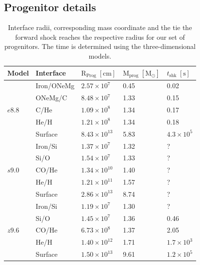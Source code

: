 \documentclass[fleqn,usenatbib]{mnras}
\begin{document}
\begin{appendices}
\section{Progenitor details}

\begin{table}
   \begin{tabular}{l l l l l} 
   \hline
     Model      &Interface & $\mathrm{R_{Prog}\;[cm]}$ & $\mathrm{M_{prog}\;[M_{\odot}]}$ & $t_{\mathrm{shk}}\;\mathrm{[s]}$\\ [0.5ex] 
   \hline
   \multirow{5}{*}{$e8.8$} & Iron/ONeMg & $2.57\times 10^{7}$  & 0.45 & 0.02 \\ 
                           & ONeMg/C    & $8.48\times 10^{7}$  & 1.33 & 0.15 \\
                           & C/He       & $1.09\times 10^{8}$  & 1.34 & 0.17 \\
                           & He/H       & $1.21\times 10^{8}$  & 1.34 & 0.18\\
                           & Surface    & $8.43\times 10^{13}$ & 5.83 & $4.3\times10^5$\\
   \hline
   \multirow{5}{*}{$s9.0$} & Iron/Si    & $1.37\times 10^{7}$   & 1.32 & ? \\ 
                           & Si/O       & $1.54\times 10^{7}$   & 1.33 & ? \\ 
                           & CO/He      & $1.34\times 10^{10}$  & 1.40 & ? \\
                           & He/H       & $1.21\times 10^{11}$  & 1.57 & ? \\
                           & Surface    & $2.86\times 10^{13}$  & 8.74 & ? \\
   \hline
   \multirow{5}{*}{$z9.6$} & Iron/Si    & $1.19\times 10^{7}$  & 1.30 & ?\\ 
                           & Si/O       & $1.45\times 10^{7}$  & 1.36 & 0.46\\ 
                           & CO/He      & $6.73\times 10^{8}$  & 1.37 & 2.05\\
                           & He/H       & $1.40\times 10^{12}$ & 1.71 & $1.7\times10^{3}$\\
                           & Surface    & $1.50\times 10^{13}$ & 9.61 & $1.2\times10^5$  \\
   \end{tabular}
   \caption{Interface radii, corresponding mass coordinate and the tie the forward shock reaches the respective radius for our set of progenitors. The time is determined using the three-dimensional models.}
   \label{tab:progenitors}
\end{table}


\end{appendices}
\end{document}
